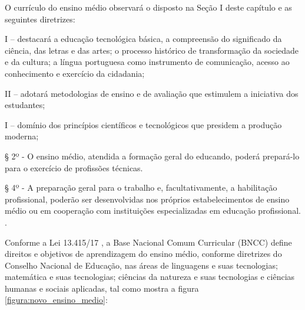 \begin{citacao}
    O currículo do ensino médio observará o disposto na Seção I deste capítulo e as seguintes diretrizes:

    I – destacará a educação tecnológica básica, a compreensão do significado da ciência, das letras e das artes; o processo histórico de transformação da sociedade e da cultura; a língua portuguesa como instrumento de comunicação, acesso ao conhecimento e exercício da cidadania;
    
    II – adotará metodologias de ensino e de avaliação que estimulem a iniciativa dos estudantes;
    
    I – domínio dos princípios científicos e tecnológicos que presidem a produção moderna;
    
    § 2º - O ensino médio, atendida a formação geral do educando, poderá prepará-lo para o exercício de profissões técnicas.
    
    § 4º - A preparação geral para o trabalho e, facultativamente, a habilitação profissional, poderão ser desenvolvidas nos próprios estabelecimentos de ensino médio ou em cooperação com instituições especializadas em educação profissional. \cite{lei9394}.
\end{citacao}

Conforme a Lei 13.415/17 \cite{lei13415}, a Base Nacional Comum Curricular (BNCC) define direitos e objetivos de aprendizagem do ensino médio, conforme diretrizes do Conselho Nacional de Educação, nas áreas de linguagens e suas tecnologias; matemática e suas tecnologias; ciências da natureza e suas tecnologias e ciências humanas e sociais aplicadas, tal como mostra a figura \ref{figura:novo_ensino_medio}:


